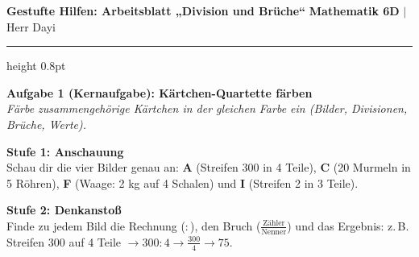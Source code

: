 \documentclass[a4paper, 10pt]{article}
\begin{document}

\noindent
{\color{primaryBlue}\bfseries\large \faLayerGroup\enskip Gestufte Hilfen: Arbeitsblatt „Division und Brüche“}
\hfill
{\footnotesize\color{primaryBlue!80} \textbf{Mathematik 6D} \quad$|$\quad Herr Dayi}
\vspace{1.5mm}
{\color{primaryBlue!40}\hrule height 0.8pt}
\vspace{3mm}

\begin{tcolorbox}[enhanced, colback=lvlBlue!5, colframe=lvlBlue!60, arc=2mm, boxrule=0.8pt, left=3mm, right=3mm, top=2mm, bottom=2mm]
    {\bfseries\color{lvlBlue} \faThLarge\enskip Aufgabe 1 (Kernaufgabe): Kärtchen-Quartette färben}\\[1mm]
    {\footnotesize\textit{Färbe zusammengehörige Kärtchen in der gleichen Farbe ein (Bilder, Divisionen, Brüche, Werte).}}
\end{tcolorbox}

\vspace{1.2mm}

\begin{tcolorbox}[colback=step1Bg, colframe=step1Border, arc=1.8mm, boxrule=0.7pt, left=3mm, right=3mm, top=1.8mm, bottom=1.8mm]
    {\color{step1Text}\small\bfseries\faEye\enskip Stufe 1: Anschauung}\\[1mm]
    {\footnotesize Schau dir die vier Bilder genau an: \textbf{A} (Streifen 300 in 4 Teile), \textbf{C} (20 Murmeln in 5 Röhren), \textbf{F} (Waage: 2 kg auf 4 Schalen) und \textbf{I} (Streifen 2 in 3 Teile).}
\end{tcolorbox}

\begin{tcolorbox}[colback=step2Bg, colframe=step2Border, arc=1.8mm, boxrule=0.7pt, left=3mm, right=3mm, top=1.8mm, bottom=1.8mm]
    {\color{step2Text}\small\bfseries\faLightbulb\enskip Stufe 2: Denkanstoß}\\[1mm]
    {\footnotesize Finde zu jedem Bild die Rechnung ($:$), den Bruch ($\frac{\text{Zähler}}{\text{Nenner}}$) und das Ergebnis:
    z.\,B. Streifen 300 auf 4 Teile $\to 300:4 \to \frac{300}{4} \to 75$.}
\end{tcolorbox}
\end{document}
